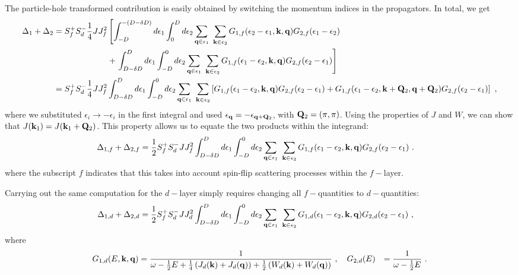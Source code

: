 \documentclass[%
reprint,
superscriptaddress,
groupedaddress,
superscriptaddress,
onecolumn,
10pt
]{revtex4-2}
\begin{document}
The particle-hole transformed contribution is easily obtained by switching the momentum indices in the propagators. In total, we get
\begin{equation}\begin{aligned}
	\Delta_{1}  + \Delta_2 = S_f^+ S_d^- \frac{1}{4}J J_f^2 &\left[\int_{-D}^{-(D - \delta D)} d\epsilon_1 \int_0^D d\epsilon_2 \sum_{{\bf q} \in \epsilon_1}~\sum_{{\bf k} \in \epsilon_2}G_{1,f}(\epsilon_2 - \epsilon_1, {\bf k}, {\bf q}) G_{2,f}(\epsilon_1 - \epsilon_2) \right.\\
															&+\left. \int_{D - \delta D}^{D} d\epsilon_1 \int_{-D}^0 d\epsilon_2 \sum_{{\bf q} \in \epsilon_1}~\sum_{{\bf k} \in \epsilon_2}G_{1,f}(\epsilon_1 - \epsilon_2, {\bf k}, {\bf q}) G_{2,f}(\epsilon_2 - \epsilon_1)\right]~\\
	=S_f^+ S_d^- \frac{1}{4}J J_f^2 &\int_{D - \delta D}^{D} d\epsilon_1 \int_{-D}^0 d\epsilon_2 \sum_{{\bf q} \in \epsilon_1}~\sum_{{\bf k} \in \epsilon_2}\left[G_{1,f}(\epsilon_1 - \epsilon_2, {\bf k}, {\bf q}) G_{2,f}(\epsilon_2 - \epsilon_1) + G_{1,f}(\epsilon_1 - \epsilon_2, {\bf k} + {\bf Q}_2, {\bf q} + {\bf Q}_2) G_{2,f}(\epsilon_2 - \epsilon_1)\right]~,
\end{aligned}\end{equation}
where we substituted \(\epsilon_i \to -\epsilon_i\) in the first integral and used \(\epsilon_{\bf q} = -\epsilon_{{\bf q} + {\bf Q}_2}\), with \({\bf Q}_2 = \left(\pi, \pi\right)\). Using the properties of \(J\) and \(W\), we can show that \(J({\bf k}_1) = J({\bf k}_1 + {\bf Q}_2)\). This property allows us to equate the two products within the integrand:
\begin{equation}\begin{aligned}
	\Delta_{1,f}  + \Delta_{2,f} = \frac{1}{2}S_f^+ S_d^- J J_f^2 &\int_{D - \delta D}^{D} d\epsilon_1 \int_{-D}^0 d\epsilon_2 \sum_{{\bf q} \in \epsilon_1}~\sum_{{\bf k} \in \epsilon_2}G_{1,f}(\epsilon_1 - \epsilon_2, {\bf k}, {\bf q}) G_{2,f}(\epsilon_2 - \epsilon_1) ~.
\end{aligned}\end{equation}
where the subscript \(f\) indicates that this takes into account spin-flip scattering processes within the \(f-\)layer.

Carrying out the same computation for the \(d-\)layer simply requires changing all \(f-\)quantities to \(d-\)quantities:
\begin{equation}\begin{aligned}
	\Delta_{1,d}  + \Delta_{2,d} = \frac{1}{2}S_f^+ S_d^- J J_d^2 &\int_{D - \delta D}^{D} d\epsilon_1 \int_{-D}^0 d\epsilon_2 \sum_{{\bf q} \in \epsilon_1}~\sum_{{\bf k} \in \epsilon_2}G_{1,d}(\epsilon_1 - \epsilon_2, {\bf k}, {\bf q}) G_{2,d}(\epsilon_2 - \epsilon_1) ~,
\end{aligned}\end{equation}
where 
\begin{equation}\begin{aligned}
	G_{1,d}(E, {\bf k}, {\bf q}) &= \frac{1}{\omega - \frac{1}{2}E + \frac{1}{4}\left(J_d({\bf k}) + J_d({\bf q})\right) + \frac{1}{2}\left(W_d({\bf k}) + W_d({\bf q})\right)}~,\quad G_{2,d}(E) &= \frac{1}{\omega - \frac{1}{2}E}~.
\end{aligned}\end{equation}
\end{document}
